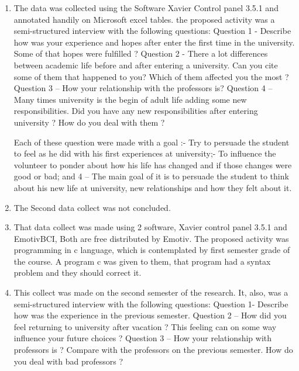 \documentclass[12pt,openright,a4paper]{article}
\begin{document}
 \begin{enumerate}
 	\item The data was collected using the Software Xavier Control panel 3.5.1 and annotated handily on Microsoft excel tables.
 	 the proposed activity was a semi-structured interview with the following questions:\newline
 	 Question 1 - Describe how was your experience and hopes after enter the first time in the university. Some of that hopes were fulfilled ? \newline
 	 Question 2  - There a lot differences between academic life before and after entering a university. Can you cite some of them that happened to you? Which of them affected you the most ?\newline
 	 Question 3 – How your relationship with the professors is?\newline
 	 Question 4 – Many times university is the begin of adult life adding some new responsibilities. Did you have any new responsibilities after entering university ? How do you deal with them ?\newline
 	 
 	 Each of these question were made with a goal :- Try to persuade the student to feel as he did with his first experiences at university;-  To influence the volunteer to ponder about how his life has changed and if those changes were good or bad; and 4 – The main goal of it is to persuade the student to think about his new life at university, new relationships and how they felt about it.\newline
  \item  The Second data collect was not concluded.
  \item That data collect was made using 2 software, Xavier control panel 3.5.1 and EmotivBCI, Both are free distributed by Emotiv. The proposed activity was programming in c language, which is contemplated by first semester grade of the course. A program c was given to them, that program had a syntax problem and they should correct it. 
  
  \item This collect was made on the second semester of the research. It, also, was a semi-structured interview with the following questions:\newline
  Question 1- Describe how was the experience in the previous semester.\newline
  Question 2 – How did you feel returning to university after vacation ? This feeling can on some way influence your future choices ?\newline
  Question 3 – How your relationship with professors is ? Compare with the professors on the previous semester. How do you deal with bad professors ?\newline
  

\end{enumerate}
\end{document}

